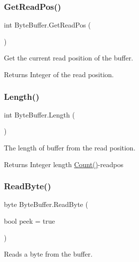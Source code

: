 \subsubsection{\texorpdfstring{GetReadPos()}{GetReadPos()}}
{\footnotesize\ttfamily int Byte\+Buffer.\+Get\+Read\+Pos (\begin{DoxyParamCaption}{ }\end{DoxyParamCaption})}



Get the current read position of the buffer. 

\begin{DoxyReturn}{Returns}
Integer of the read position.
\end{DoxyReturn}
\mbox{\label{class_byte_buffer_a45c99a0058fc2d9d38b5829bf34f6317}} 
\subsubsection{\texorpdfstring{Length()}{Length()}}
{\footnotesize\ttfamily int Byte\+Buffer.\+Length (\begin{DoxyParamCaption}{ }\end{DoxyParamCaption})}



The length of buffer from the read position. 

\begin{DoxyReturn}{Returns}
Integer length \mbox{\hyperlink{class_byte_buffer_ab599e90a3d53e05e8e04e2388f444873}{Count()}}-\/readpos
\end{DoxyReturn}
\mbox{\label{class_byte_buffer_a3d3bf87754a8bba775bbba0cc7ab3ce4}} 
\subsubsection{\texorpdfstring{ReadByte()}{ReadByte()}}
{\footnotesize\ttfamily byte Byte\+Buffer.\+Read\+Byte (\begin{DoxyParamCaption}\item[{bool}]{peek = {\ttfamily true} }\end{DoxyParamCaption})}



Reads a byte from the buffer. 


